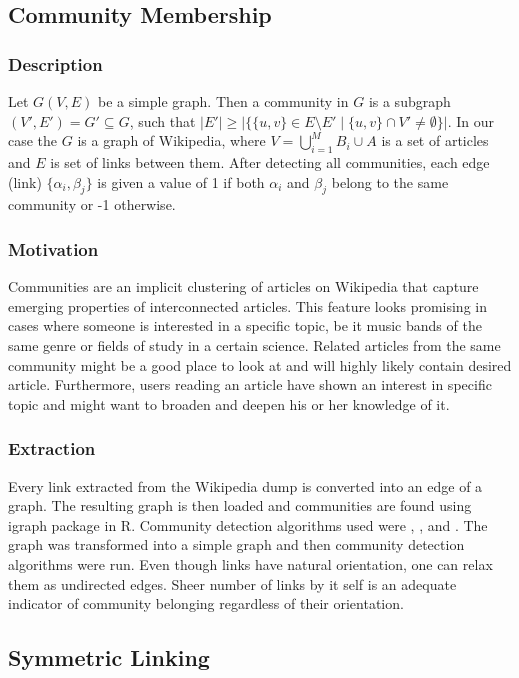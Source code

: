 \subsection{Community Membership}

\subsubsection{Description}
Let $G(V,E)$ be a simple graph. Then a community in $G$ is a subgraph $(V', E') = G' \subseteq G$, such that $|E'| \ge |\{ \{u,v\} \in E\setminus E'  \; | \; \{u, v\} \cap V' \neq \emptyset \}|$. In our case the $G$ is a graph of Wikipedia, where $V = \bigcup_{i=1}^{M} B_i \cup A$ is a set of articles and $E$ is set of links between them. After detecting all communities, each edge (link) $\{\alpha_i,\beta_j\}$ is given a value of 1 if both $\alpha_i$ and $\beta_j$ belong to the same community or -1 otherwise.

\subsubsection{Motivation}
Communities are an implicit clustering of articles on Wikipedia that capture emerging properties of interconnected articles. This feature looks promising in cases where someone is interested in a specific topic, be it music bands of the same genre or fields of study in a certain science. Related articles from the same community might be a good place to look at and will highly likely contain desired article. Furthermore, users reading an article have shown an interest in specific topic and might want to broaden and deepen his or her knowledge of it.

\subsubsection{Extraction}
Every link extracted from the Wikipedia dump is converted into an edge of a graph. The resulting graph is then loaded and communities are found using igraph package in R. Community detection algorithms used were \cite{fast_greedy}, \cite{label_propagation}, and \cite{infomap}. The graph was transformed into a simple graph and then community detection algorithms were run. Even though links have natural orientation, one can relax them as undirected edges. Sheer number of links by it self is an adequate indicator of community belonging regardless of their orientation.

\subsection{Symmetric Linking}

